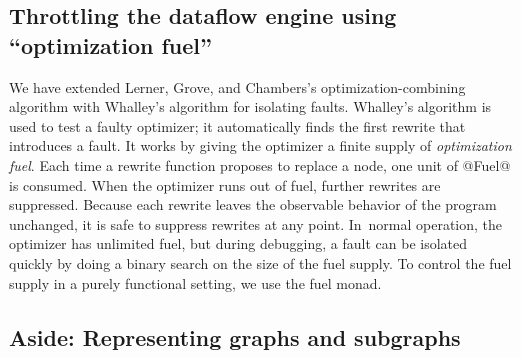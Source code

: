 \documentclass[blockstyle,preprint,natbib,nocopyrightspace]{sigplanconf}
\def\authornote#1{\unskip\relax}
\newcommand{\norman}[1]{\authornote{NR: #1}}
\let\remark\norman
\newcommand\delendum[1]{\unskip\relax}
\newcommand\seclabel[1]{\label{sec:#1}}
\begin{document}

\subsection{Throttling the dataflow engine using ``optimization
  fuel''}

\seclabel{vpoiso}
\seclabel{fuel}

We have extended Lerner, Grove, and Chambers's optimization-combining algorithm with
Whalley's \citeyearpar{whalley:isolation} algorithm for isolating
faults.
Whalley's algorithm is used to test a faulty optimizer;
it automatically
finds the first rewrite that introduces a fault.
It works by giving the optimizer a finite supply of \emph{optimization
fuel}.
Each time a rewrite function proposes to replace a node, one unit of @Fuel@ is
consumed.
When the optimizer runs out of fuel, further rewrites are suppressed.
Because each rewrite leaves the observable behavior of the
program unchanged, it is safe to suppress rewrites at
any point.
In~normal operation, the optimizer has unlimited fuel, but during
debugging, a fault can be isolated quickly by doing a binary search on
the size of the fuel supply.
To control the fuel supply in a purely functional setting, we use
the fuel monad.


\subsection{Aside: Representing graphs and subgraphs}

\seclabel{subgraphs}

\delendum{There is a confusion of terminology.  In this section 
we say that a ``graph'' may also contain two special incomplete blocks.
But later we use the terms ``subgraph'' and ``replacement graph'' to mean
one of these more general graphs; and ``full graph'' to mean (I think)
a closed/closed graph.   Let's define these terms, and use them consistently.
I think we can define a ``full graph'' as closed/closed, and a ``subgraph'' as
one of the other three combinations.
}

\remark{I've added a \P\ defining ``replacement graph'' and
``subgraph.''
A full graph is open/closed, but that's a somewhat arbitrary design
choice that I'd prefer not to expose in this paper.}
\end{document}

